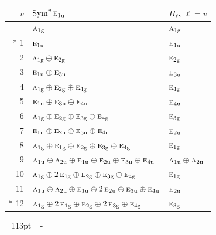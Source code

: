 \documentclass[10pt,a4paper]{article}
\newcommand{\needspace}[1]{\par\penalty-100\begingroup\dimen0=#1\relax\dimen2=\pagegoal
  \advance\dimen2-\pagetotal\ifdim\dimen0>\dimen2\relax\ifdim\dimen2>0pt\vfil\break\fi\fi
  \endgroup}
\numberwithin{equation}{section}
\newcommand{\irr}[1]{\text{\normalfont\scshape #1}}
\newcommand{\ptag}[1]{\mathrm{#1}}
\begin{document}
{\small\begin{longtable}{@{}rll@{}}\toprule
$v$ & $\operatorname{Sym}^{v}\irr{e}_{1\ptag{u}}$ & $H_\ell$, $\ell = v$\\\midrule\endhead
\bottomrule\endfoot\endlastfoot
0 & $\irr{a}_{1\ptag{g}}$ & $\irr{a}_{1\ptag{g}}$\\*
1 & $\irr{e}_{1\ptag{u}}$ & $\irr{e}_{1\ptag{u}}$\\
2 & $\irr{a}_{1\ptag{g}} \oplus \irr{e}_{2\ptag{g}}$ & $\irr{e}_{2\ptag{g}}$\\
3 & $\irr{e}_{1\ptag{u}} \oplus \irr{e}_{3\ptag{u}}$ & $\irr{e}_{3\ptag{u}}$\\
4 & $\irr{a}_{1\ptag{g}} \oplus \irr{e}_{2\ptag{g}} \oplus \irr{e}_{4\ptag{g}}$ & $\irr{e}_{4\ptag{g}}$\\
5 & $\irr{e}_{1\ptag{u}} \oplus \irr{e}_{3\ptag{u}} \oplus \irr{e}_{4\ptag{u}}$ & $\irr{e}_{4\ptag{u}}$\\
6 & $\irr{a}_{1\ptag{g}} \oplus \irr{e}_{2\ptag{g}} \oplus \irr{e}_{3\ptag{g}} \oplus \irr{e}_{4\ptag{g}}$ & $\irr{e}_{3\ptag{g}}$\\
7 & $\irr{e}_{1\ptag{u}} \oplus \irr{e}_{2\ptag{u}} \oplus \irr{e}_{3\ptag{u}} \oplus \irr{e}_{4\ptag{u}}$ & $\irr{e}_{2\ptag{u}}$\\
8 & $\irr{a}_{1\ptag{g}} \oplus \irr{e}_{1\ptag{g}} \oplus \irr{e}_{2\ptag{g}} \oplus \irr{e}_{3\ptag{g}} \oplus \irr{e}_{4\ptag{g}}$ & $\irr{e}_{1\ptag{g}}$\\
9 & $\irr{a}_{1\ptag{u}} \oplus \irr{a}_{2\ptag{u}} \oplus \irr{e}_{1\ptag{u}} \oplus \irr{e}_{2\ptag{u}} \oplus \irr{e}_{3\ptag{u}} \oplus \irr{e}_{4\ptag{u}}$ & $\irr{a}_{1\ptag{u}} \oplus \irr{a}_{2\ptag{u}}$\\
10 & $\irr{a}_{1\ptag{g}} \oplus 2\,\irr{e}_{1\ptag{g}} \oplus \irr{e}_{2\ptag{g}} \oplus \irr{e}_{3\ptag{g}} \oplus \irr{e}_{4\ptag{g}}$ & $\irr{e}_{1\ptag{g}}$\\
11 & $\irr{a}_{1\ptag{u}} \oplus \irr{a}_{2\ptag{u}} \oplus \irr{e}_{1\ptag{u}} \oplus 2\,\irr{e}_{2\ptag{u}} \oplus \irr{e}_{3\ptag{u}} \oplus \irr{e}_{4\ptag{u}}$ & $\irr{e}_{2\ptag{u}}$\\*
12 & $\irr{a}_{1\ptag{g}} \oplus 2\,\irr{e}_{1\ptag{g}} \oplus \irr{e}_{2\ptag{g}} \oplus 2\,\irr{e}_{3\ptag{g}} \oplus \irr{e}_{4\ptag{g}}$ & $\irr{e}_{3\ptag{g}}$\\
\bottomrule\end{longtable}}
\needspace{113pt}
\end{document}
